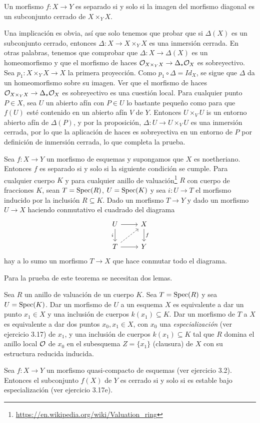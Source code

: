 \documentclass[GA.tex]{subfiles}
\begin{document}
\begin{coro}
Un morfismo $f:X\to Y$ es separado si y solo si la imagen del morfismo diagonal es un subconjunto cerrado de $X\times_Y X$.
\end{coro}
\begin{dem}
Una implicación es obvia, así que solo tenemos que probar que si $\Delta(X)$ es un subconjunto cerrado, entonces $\Delta:X\to X\times_Y X$ es una inmersión cerrada. En otras palabras, tenemos que comprobar que $\Delta:X\to \Delta(X)$ es un homeomorfismo y que el morfismo de haces ${\mathcal O}_{X\times_Y X}\to\Delta_*{\mathcal O}_X$ es sobreyectivo. Sea $p_1:X\times_Y X\to X$ la primera proyección. Como $p_1\circ\Delta=Id_X$, se sigue que $\Delta$ da un homeomorfismo sobre su imagen. Ver que el morfismo de haces ${\mathcal O}_{X\times_Y X}\to\Delta_*{\mathcal O}_X$ es sobreyectivo es una cuestión local. Para cualquier punto $P\in X$, sea $U$ un abierto afín con $P\in U$ lo bastante pequeño como para que $f(U)$ esté contenido en un abierto afín $V$ de $Y$. Entonces $U\times_V U$ is un entorno abierto afín de $\Delta(P)$, y por la proposición, $\Delta:U\to U\times_V U$ es una inmersión cerrada, por lo que la aplicación de haces es sobreyectiva en un entorno de $P$ por definición de inmersión cerrada, lo que completa la prueba.  
\end{dem}

\begin{teorema}
Sea $f:X\to Y$ un morfismo de esquemas y supongamos que $X$ es noetheriano. Entonces $f$ es separado si y solo si la siguiente condición se cumple. Para cualquier cuerpo $K$ y para cualquier anillo de valuación\footnote{\url{https://en.wikipedia.org/wiki/Valuation_ring}} $R$ con cuerpo de fracciones $K$, sean $T=\operatorname{Spec}(R)$, $U=\operatorname{Spec}(K)$ y sea $i:U\to T$ el morfismo inducido por la inclusión $R\subseteq K$. Dado un morfismo $T\to Y$ y dado un morfismo $U\to X$ haciendo conmutativo el cuadrado del diagrama
\[
\begin{tikzcd}
U\arrow[r]\arrow[d, "i"'] & X\arrow[d, "f"]\\
T\arrow[r]\arrow[ur, dashed] & Y
\end{tikzcd}
\]
hay a lo sumo un morfismo $T\to X$ que hace conmutar todo el diagrama. 
\end{teorema}

Para la prueba de este teorema se necesitan dos lemas.

\begin{lemma}
Sea $R$ un anillo de valuación de un cuerpo $K$. Sea $T=\operatorname{Spec}(R)$ y sea $U=\operatorname{Spec}(K)$. Dar un morfismo de $U$ a un esquema $X$ es equivalente a dar un punto $x_1\in X$ y una inclusión de cuerpos $k(x_1)\subseteq K$. Dar un morfismo de $T$ a $X$ es equivalente a dar dos puntos $x_0,x_1\in X$, con $x_0$ una \emph{especialización } (ver ejercicio 3.17) de $x_1$, y una inclusión de cuerpos $k(x_1)\subseteq K$ tal que $R$ domina el anillo local ${\mathcal O}$ de $x_0$ en el subesquema $Z=\overline{\{x_1\}}$ (clausura) de $X$ con su estructura reducida inducida. 
\end{lemma}



\begin{lemma}
Sea $f:X\to Y$ un morfismo quasi-compacto de esquemas (ver ejercicio 3.2). Entonces el subconjunto $f(X)$ de $Y$ es cerrado si y solo si es estable bajo especialización (ver ejercicio 3.17e). 
\end{lemma}
\end{document}
